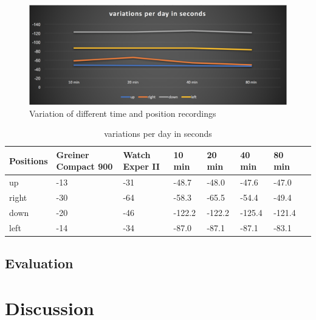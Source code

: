 \documentclass[12pt, a4paper]{report}
\begin{document}
    \noindent
    \begin{figure}[H]
        \includegraphics[scale=0.5]{Images/variations_per_day.png}
    
    \caption{ Variation of different time and position recordings}
    \end{figure}    
    
    \begin{table}[H]
      \centering
        \begin{tabularx}{\linewidth}{ |L|L|L|L|L|L|L|L|  }
        \hline
        {\fontsize{10}{12}\selectfont \textbf{Positions}} &{\fontsize{9}{10}\selectfont \textbf{Greiner Compact 900}} & {\fontsize{10}{12}\selectfont \textbf{Watch Exper II}} & {\fontsize{10}{12}\selectfont \textbf{10 min}} &  {\fontsize{10}{12}\selectfont \textbf{20 min}} &  {\fontsize{10}{12}\selectfont \textbf{40 min}} & {\fontsize{10}{12}\selectfont  \textbf{80 min}} \\ \hline
        up        & -13                 &      -31  & -48.7     & -48.0     & -47.6      & -47.0      \\ \hline
        right     & -30                 &      -64  & -58.3      & -65.5    & -54.4      & -49.4      \\ \hline
        down      & -20               &  -46  & -122.2    & -122.2     & -125.4    & -121.4      \\ \hline
        left      & -14                & -34 & -87.0	   & -87.1	  & -87.1	  & -83.1      \\ \hline
        \end{tabularx}
          \caption{ variations per day in seconds} 
    \end{table}
    
    \section{Evaluation}
    
    \chapter{Discussion}
\end{document}
